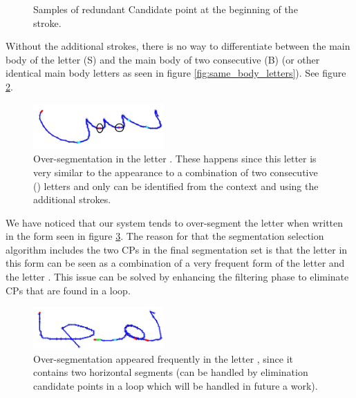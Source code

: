 \documentclass[journal,compsoc]{IEEEtran}
\begin{document}
\begin{figure}[h]
\centering
    \caption{Samples of redundant Candidate point at the beginning of the stroke.}
   \label{fig:oversegmentation_begin}
\end{figure}

Without the additional strokes, there is no way to differentiate between the main body of the letter  (S) and the main body of two consecutive  (B) (or other identical main body letters as seen in figure \ref{fig:same_body_letters}). See figure \ref{fig:oversegmentation_s}.  

\begin{figure}
\centering
\includegraphics[width=5cm]{./figures/oversegmentation_s}
\caption{Over-segmentation in the letter . These happens since this letter is very similar to the appearance to a combination of two consecutive  () letters and only can be identified from the context and using the additional strokes.}
\label{fig:oversegmentation_s}
\end{figure}

We have noticed that our system tends to over-segment the letter  when written in the form seen in figure \ref{fig:oversegmentation_m}. The reason for that the segmentation selection algorithm includes the two CPs in the final segmentation set is that the letter in this form can be seen as a combination of a very frequent form of the letter  and the letter . This issue can be solved by enhancing the filtering phase to eliminate CPs that are found in a loop.  

\begin{figure}
\centering
\includegraphics[width=5cm]{./figures/oversegmentation_m}
\caption{Over-segmentation appeared frequently in the letter , since it contains two horizontal segments (can be handled by elimination candidate points in a loop which will be handled in future a work).}
\label{fig:oversegmentation_m}
\end{figure}
\end{document}
